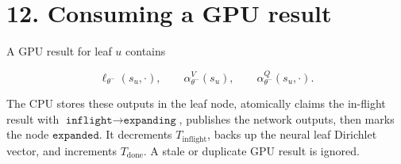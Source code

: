 \documentclass[11pt]{article}
\begin{document}
\section*{12. Consuming a GPU result}

A GPU result for leaf \(u\) contains

\[
\ell_{\theta^-}(s_u,\cdot),
\qquad
\alpha_{\theta^-}^V(s_u),
\qquad
\alpha_{\theta^-}^Q(s_u,\cdot).
\]

The CPU stores these outputs in the leaf node, atomically claims the in-flight
result with \(\texttt{inflight}\rightarrow\texttt{expanding}\), publishes the
network outputs, then marks the node \(\texttt{expanded}\). It decrements
\(T_{\mathrm{inflight}}\), backs up the neural leaf Dirichlet vector, and increments
\(T_{\mathrm{done}}\). A stale or duplicate GPU result is ignored.
\end{document}
